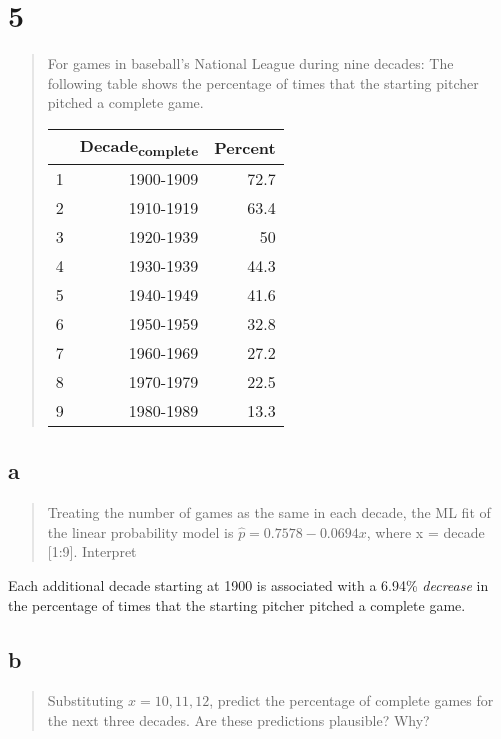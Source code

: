 \documentclass[11pt]{article}
\begin{document}
\section{5}
\label{sec:org1bee55a}
\begin{quote}
For games in baseball's National League during nine decades: The following table
shows the percentage of times that the starting pitcher pitched a complete game.

\begin{center}
\begin{tabular}{rrr}
 & Decade\textsubscript{complete} & Percent\\
\hline
1 & 1900-1909 & 72.7\\
2 & 1910-1919 & 63.4\\
3 & 1920-1939 & 50\\
4 & 1930-1939 & 44.3\\
5 & 1940-1949 & 41.6\\
6 & 1950-1959 & 32.8\\
7 & 1960-1969 & 27.2\\
8 & 1970-1979 & 22.5\\
9 & 1980-1989 & 13.3\\
\end{tabular}
\end{center}
\end{quote}

\subsection{a}
\label{sec:orge8dbf12}
\begin{quote}
Treating the number of games as the same in each decade, the ML fit of the
linear probability model is \(\hat p = 0.7578 - 0.0694 x\), where x = decade
[1:9]. Interpret
\end{quote}

Each additional decade starting at 1900 is associated with a 6.94\% \emph{decrease} in
the percentage of times that the starting pitcher pitched a complete game.

\subsection{b}
\label{sec:org7ddbf46}
\begin{quote}
Substituting \(x = 10,11,12\), predict the percentage of complete games for the
next three decades. Are these predictions plausible? Why?
\end{quote}
\end{document}
